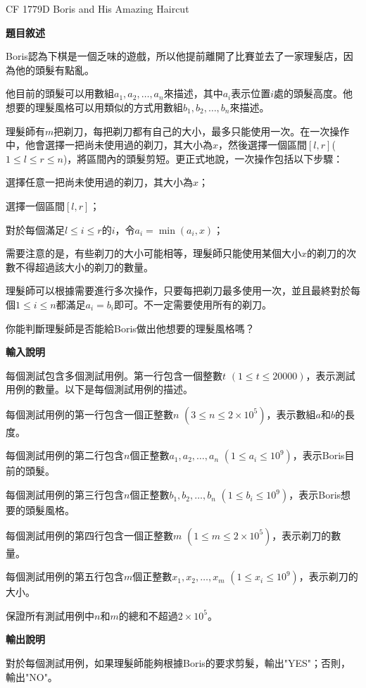     \problem CF 1779D Boris and His Amazing Haircut

    \textbf{題目敘述}

    Boris認為下棋是一個乏味的遊戲，所以他提前離開了比賽並去了一家理髮店，因為他的頭髮有點亂。

    他目前的頭髮可以用數組$a_1,a_2,\ldots,a_n$來描述，其中$a_i$表示位置$i$處的頭髮高度。他想要的理髮風格可以用類似的方式用數組$b_1,b_2,\ldots,b_n$來描述。
    
    理髮師有$m$把剃刀，每把剃刀都有自己的大小，最多只能使用一次。在一次操作中，他會選擇一把尚未使用過的剃刀，其大小為$x$，然後選擇一個區間$[l,r]$($1 \le l \le r \le n$)，將區間內的頭髮剪短。更正式地說，一次操作包括以下步驟：
    
    選擇任意一把尚未使用過的剃刀，其大小為$x$；
    
    選擇一個區間$[l,r]$；
    
    對於每個滿足$l \le i \le r$的$i$，令$a_i = \min(a_i,x)$；
    
    需要注意的是，有些剃刀的大小可能相等，理髮師只能使用某個大小$x$的剃刀的次數不得超過該大小的剃刀的數量。
    
    理髮師可以根據需要進行多次操作，只要每把剃刀最多使用一次，並且最終對於每個$1 \le i \le n$都滿足$a_i = b_i$即可。不一定需要使用所有的剃刀。
    
    你能判斷理髮師是否能給Boris做出他想要的理髮風格嗎？

    \textbf{輸入說明}

    每個測試包含多個測試用例。第一行包含一個整數$t$ $(1 \le t \le 20000)$，表示測試用例的數量。以下是每個測試用例的描述。

    每個測試用例的第一行包含一個正整數$n$ $(3 \le n \le 2 \times 10^5)$，表示數組$a$和$b$的長度。
    
    每個測試用例的第二行包含$n$個正整數$a_1,a_2,\ldots,a_n$ $(1 \le a_i \le 10^9)$，表示Boris目前的頭髮。
    
    每個測試用例的第三行包含$n$個正整數$b_1,b_2,\ldots,b_n$ $(1 \le b_i \le 10^9)$，表示Boris想要的頭髮風格。
    
    每個測試用例的第四行包含一個正整數$m$ $(1 \le m \le 2 \times 10^5)$，表示剃刀的數量。
    
    每個測試用例的第五行包含$m$個正整數$x_1,x_2,\ldots,x_m$ $(1 \le x_i \le 10^9)$，表示剃刀的大小。
    
    保證所有測試用例中$n$和$m$的總和不超過$2 \times 10^5$。

    \textbf{輸出說明}

    對於每個測試用例，如果理髮師能夠根據Boris的要求剪髮，輸出"YES"；否則，輸出"NO"。

